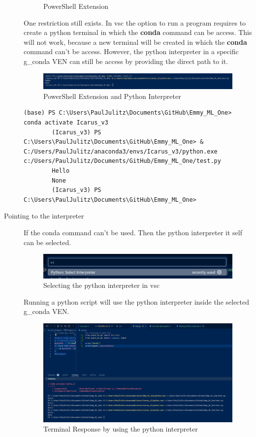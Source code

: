 \begin{description}
\begin{figure}[H]
		\caption{PowerShell Extension}
	\end{figure}
	One restriction still exists. In \gls{vsc} the option to run a program requires to create a python terminal in which the \textbf{conda} command can be access. This will not work, because a new terminal will be created in which the \textbf{conda} command can't be access. However, the python interpreter in a specific \gls{g_conda} \gls{VEN} can still be access by providing the direct path to it.
	\begin{figure}[H]
		\centering
		\includegraphics[scale = 0.4]{attachment/chapter_AML/Scc027}
		\caption{PowerShell Extension and Python Interpreter}
	\end{figure}
	\begin{lstlisting}[style=CMD, caption={Commands}, captionpos=b]
		(base) PS C:\Users\PaulJulitz\Documents\GitHub\Emmy_ML_One> conda activate Icarus_v3
		(Icarus_v3) PS C:\Users\PaulJulitz\Documents\GitHub\Emmy_ML_One> & C:/Users/PaulJulitz/anaconda3/envs/Icarus_v3/python.exe c:/Users/PaulJulitz/Documents/GitHub/Emmy_ML_One/test.py  
		Hello
		None
		(Icarus_v3) PS C:\Users\PaulJulitz\Documents\GitHub\Emmy_ML_One>
	\end{lstlisting}
	\item[Pointing to the interpreter] If the conda command can't be used.
	Then the python interpreter it self can be selected.
	\begin{figure}[H]
		\centering
		\includegraphics[scale = 0.4]{attachment/chapter_AML/Scc025}
		\caption{Selecting the python interpreter in \gls{vsc}}
	\end{figure}
	Running a python script will use the python interpreter inside the selected \gls{g_conda} \gls{VEN}.
	\begin{figure}[H]
		\centering
		\includegraphics[scale = 0.2]{attachment/chapter_AML/Scc024}
		\caption{Terminal Response by using the python interpreter}
	\end{figure}
\end{description}

